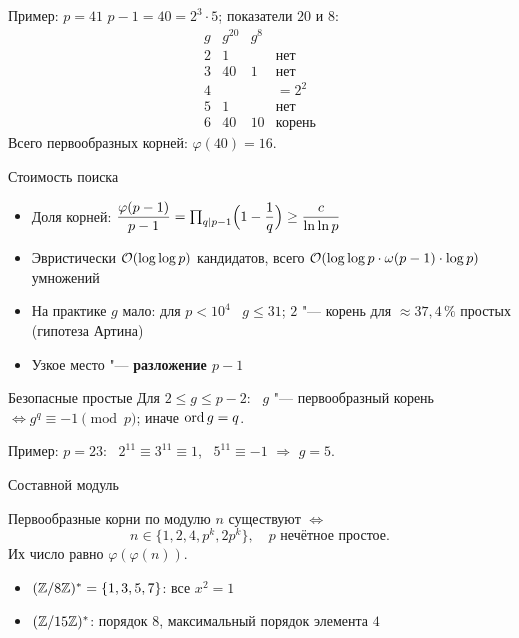 \documentclass{ca-slides}
\begin{document}
\begin{canvasframe}{Пример: $p = 41$}
  $p - 1 = 40 = 2^3 \cdot 5$; показатели $20$ и $8$:
  \[
  \begin{array}{c|cc|l}
    g & g^{20} & g^{8} & \\ \hline
    2 & 1 & & \text{нет} \\
    3 & 40 & 1 & \text{нет} \\
    4 & & & = 2^2 \\
    5 & 1 & & \text{нет} \\
    6 & 40 & 10 & \text{корень}
  \end{array}
  \]
  Всего первообразных корней: $\varphi(40) = 16$.
  \penspace[0.15\textheight]
\end{canvasframe}

\begin{canvasframe}{Стоимость поиска}
  \begin{itemize}
    \item Доля корней: $\dfrac{\varphi(p-1)}{p-1} = \prod_{q \mid p-1}\Bigl(1 - \dfrac1q\Bigr)
      \ge \dfrac{c}{\ln\ln p}$
    \item Эвристически $\mathcal{O}(\log\log p)$ кандидатов, всего
      $\mathcal{O}(\log\log p \cdot \omega(p - 1) \cdot \log p)$ умножений
    \item На практике $g$ мало: для $p < 10^4$ \ $g \le 31$; $2$ "--- корень для $\approx 37{,}4\,\%$
      простых (гипотеза Артина)
    \item Узкое место "--- \textbf{разложение $p - 1$}
  \end{itemize}
  \penspace[0.2\textheight]
\end{canvasframe}

\begin{theoremframe}[proposition]{Безопасные простые}
  Для $2 \le g \le p - 2$: \ $g$ "--- первообразный корень $\iff g^q \equiv -1 \pmod p$;
  иначе $\operatorname{ord} g = q$.

  \smallskip
  Пример: $p = 23$: \ $2^{11} \equiv 3^{11} \equiv 1$, \ $5^{11} \equiv -1$ $\Rightarrow$ $g = 5$.
\end{theoremframe}

\begin{canvasframe}{Составной модуль}
  \begin{theorem}[Гаусс]
    Первообразные корни по модулю $n$ существуют $\iff$
    \[n \in \{1, 2, 4, p^k, 2p^k\},\quad p \text{ нечётное простое}.\]
    Их число равно $\varphi(\varphi(n))$.
  \end{theorem}
  \begin{itemize}
    \item $(\mathbb{Z}/8\mathbb{Z})^{*} = \{1, 3, 5, 7\}$: все $x^2 = 1$
    \item $(\mathbb{Z}/15\mathbb{Z})^{*}$: порядок $8$, максимальный порядок элемента $4$
  \end{itemize}
\end{canvasframe}
\end{document}
